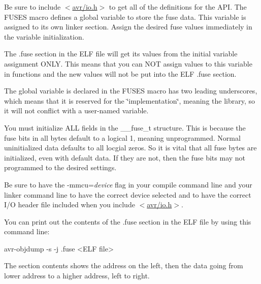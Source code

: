 Be sure to include $<$\hyperlink{io_8h}{avr/io.\+h}$>$ to get all of the definitions for the A\+PI. The F\+U\+S\+ES macro defines a global variable to store the fuse data. This variable is assigned to its own linker section. Assign the desired fuse values immediately in the variable initialization.

The .fuse section in the E\+LF file will get its values from the initial variable assignment O\+N\+LY. This means that you can N\+OT assign values to this variable in functions and the new values will not be put into the E\+LF .fuse section.

The global variable is declared in the F\+U\+S\+ES macro has two leading underscores, which means that it is reserved for the \char`\"{}implementation\char`\"{}, meaning the library, so it will not conflict with a user-\/named variable.

You must initialize A\+LL fields in the \+\_\+\+\_\+fuse\+\_\+t structure. This is because the fuse bits in all bytes default to a logical 1, meaning unprogrammed. Normal uninitialized data defaults to all locgial zeros. So it is vital that all fuse bytes are initialized, even with default data. If they are not, then the fuse bits may not programmed to the desired settings.

Be sure to have the -\/mmcu={\itshape device} flag in your compile command line and your linker command line to have the correct device selected and to have the correct I/O header file included when you include $<$\hyperlink{io_8h}{avr/io.\+h}$>$.

You can print out the contents of the .fuse section in the E\+LF file by using this command line\+: 
\begin{DoxyCode}
avr-objdump -s -j .fuse <ELF file>
\end{DoxyCode}
 The section contents shows the address on the left, then the data going from lower address to a higher address, left to right. 